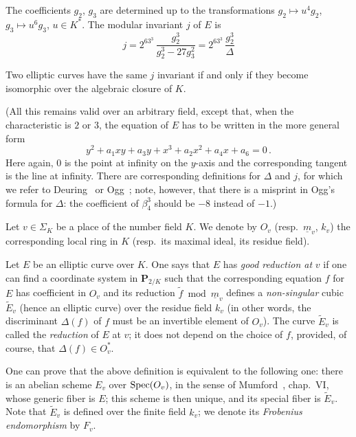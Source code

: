 The coefficients $g_2$, $g_3$ are determined up to the transformations
$g_2 \longmapsto u^4g_2$, $g_3 \longmapsto u^6g_3$, $u \in K^*$.  The
modular invariant $j$ of $E$ is
\[
j = 2^63^3\,\frac{g_2^3}{g_2^3 - 27g_3^2}
  = 2^63^3\,\frac{g_2^3}{\Delta}
\]

Two elliptic curves have the same $j$ invariant if and only if they
become isomorphic over the algebraic closure of $K$.

(All this remains valid over an arbitrary field, except that, when the
characteristic is $2$ or $3$, the equation of $E$ has to be written in
the more general form
\[
y^2 + a_1xy + a_3y + x^3 + a_2x^2 + a_4x + a_6 = 0\,.
\]
Here again, $0$ is the point at infinity on the $y$-axis and the
corresponding tangent is the line at infinity.  There are corresponding
definitions for $\Delta$ and $j$, for which we refer to
Deuring~\cite{deuring} or Ogg~\cite{ogg}; note, however, that there is
a misprint in Ogg's formula for $\Delta$: the coefficient of
$\beta_4^3$ should be $-8$ instead of $-1$.)


Let $v \in \Sigma_K$ be a place of the number field $K$.  We denote by
$O_v$ (resp.\ $\underline{m}_v$, $k_v$) the corresponding local ring in
$K$ (resp.\ its maximal ideal, its residue field).

Let $E$ be an elliptic curve over $K$.  One says that $E$ has
\emph{good reduction at} $v$ if one can find a coordinate system in
$\mathbf{P}_{2/K}$ such that the corresponding equation $f$ for $E$ has
coefficient in $O_v$ and its reduction $\tilde{f} \bmod
\underline{m}_v$ defines a \emph{non-singular} cubic
$\widetilde{E}_v$ (hence an elliptic curve) over the residue field
$k_v$ (in other words, the discriminant $\Delta(f)$ of $f$ must be an
invertible element of $O_v$).  The curve $\widetilde{E}_v$ is called
the \emph{reduction} of $E$ at $v$; it does not depend on the choice of
$f$, provided, of course, that $\Delta(f) \in O_v^*$.

One can prove that the above definition is equivalent to the following
one: there is an abelian scheme $E_v$ over $\mathrm{Spec}(O_v)$, in the sense
of Mumford~\cite{mumford-git}, chap.~VI, whose generic fiber is $E$;
this scheme is then unique, and its special fiber is
$\widetilde{E}_v$.  Note that $\widetilde{E}_v$ is defined over the
finite field $k_v$; we denote its \emph{Frobenius endomorphism} by
$F_v$.

